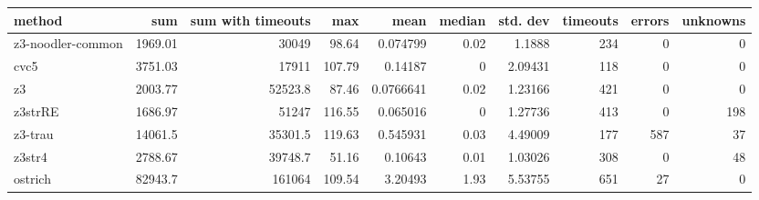 \begin{tabular}{lrrrrrrrrr}
\hline
 method            &      sum &   sum with timeouts &    max &      mean &   median &   std. dev &   timeouts &   errors &   unknowns \\
\hline
 z3-noodler-common &  1969.01 &             30049   &  98.64 & 0.074799  &     0.02 &    1.1888  &        234 &        0 &          0 \\
 cvc5              &  3751.03 &             17911   & 107.79 & 0.14187   &     0    &    2.09431 &        118 &        0 &          0 \\
 z3                &  2003.77 &             52523.8 &  87.46 & 0.0766641 &     0.02 &    1.23166 &        421 &        0 &          0 \\
 z3strRE           &  1686.97 &             51247   & 116.55 & 0.065016  &     0    &    1.27736 &        413 &        0 &        198 \\
 z3-trau           & 14061.5  &             35301.5 & 119.63 & 0.545931  &     0.03 &    4.49009 &        177 &      587 &         37 \\
 z3str4            &  2788.67 &             39748.7 &  51.16 & 0.10643   &     0.01 &    1.03026 &        308 &        0 &         48 \\
 ostrich           & 82943.7  &            161064   & 109.54 & 3.20493   &     1.93 &    5.53755 &        651 &       27 &          0 \\
\hline
\end{tabular}
